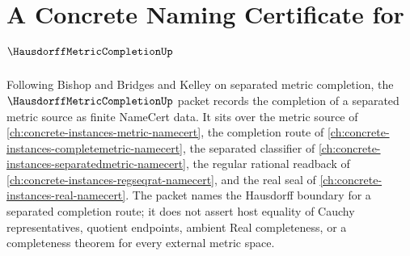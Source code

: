 \chapter{A Concrete Naming Certificate for $\HausdorffMetricCompletionUp$}
\label{ch:concrete-instances-hausdorff-metric-completion-namecert}

Following Bishop and Bridges and Kelley on separated metric completion, the $\HausdorffMetricCompletionUp$ packet records the completion of a separated metric source as finite NameCert data. It sits over the metric source of \autoref{ch:concrete-instances-metric-namecert}, the completion route of \autoref{ch:concrete-instances-completemetric-namecert}, the separated classifier of \autoref{ch:concrete-instances-separatedmetric-namecert}, the regular rational readback of \autoref{ch:concrete-instances-regseqrat-namecert}, and the real seal of \autoref{ch:concrete-instances-real-namecert}. The packet names the Hausdorff boundary for a separated completion route; it does not assert host equality of Cauchy representatives, quotient endpoints, ambient Real completeness, or a completeness theorem for every external metric space.

